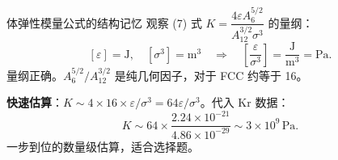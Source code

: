 \begin{insightbox}{体弹性模量公式的结构记忆}
观察 (7) 式 $K = \dfrac{4\varepsilon A_6^{5/2}}{A_{12}^{3/2}\sigma^3}$ 的量纲：
\[
  [\varepsilon] = \text{J}, \quad [\sigma^3] = \text{m}^3
  \quad\Longrightarrow\quad
  \left[\frac{\varepsilon}{\sigma^3}\right] = \frac{\text{J}}{\text{m}^3} = \text{Pa} .
\]
量纲正确。$A_6^{5/2}/A_{12}^{3/2}$ 是纯几何因子，对于 FCC 约等于 16。

\textbf{快速估算}：$K \sim 4\times 16 \times \varepsilon/\sigma^3 = 64\varepsilon/\sigma^3$。代入 Kr 数据：
\[
  K \sim 64\times\frac{2.24\times 10^{-21}}{4.86\times 10^{-29}}
    \sim 3\times 10^9\,\text{Pa} .
\]
一步到位的数量级估算，适合选择题。
\end{insightbox}
